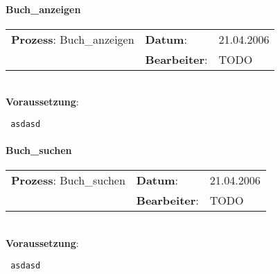 \paragraph{Buch\_anzeigen}
\begin{tabular}[t]{p{9.5cm}ll}
\textbf{Prozess}: Buch\_anzeigen  	&\textbf{Datum}:      &21.04.2006\\
					&\textbf{Bearbeiter}: &TODO\\
\end{tabular}

\hrulefill\\
\textbf{Voraussetzung}:
\begin{verbatim}
 asdasd
\end{verbatim}
\hrulefill


\paragraph{Buch\_suchen}
\begin{tabular}[t]{p{9.5cm}ll}
\textbf{Prozess}: Buch\_suchen  	&\textbf{Datum}:      &21.04.2006\\
					&\textbf{Bearbeiter}: &TODO\\
\end{tabular}

\hrulefill\\
\textbf{Voraussetzung}:
\begin{verbatim}
 asdasd
\end{verbatim}
\hrulefill